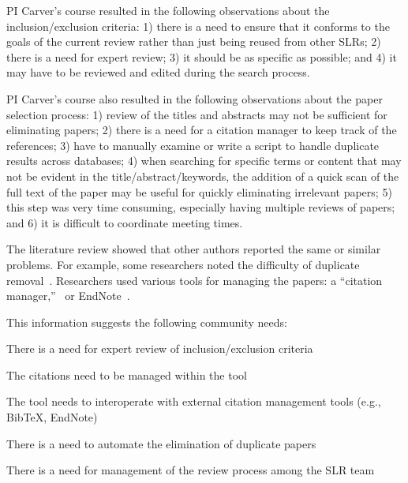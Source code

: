 PI Carver's course resulted in the following observations about the inclusion/exclusion criteria: 1) there is a need to ensure that it conforms to the goals of the current review rather than just being reused from other SLRs; 2) there is a need for expert review; 3) it should be as specific as possible; and 4) it may have to be reviewed and edited during the search process. 

PI Carver's course also resulted in the following observations about the paper selection process: 1) review of the titles and abstracts may not be sufficient for eliminating papers; 2) there is a need for a citation manager to keep track of the references; 3) have to manually examine or write a script to handle duplicate results across databases; 4) when searching for specific terms or content that may not be evident in the title/abstract/keywords, the addition of a quick scan of the full text of the paper may be useful for quickly eliminating irrelevant papers; 5) this step was very time consuming, especially having multiple reviews of papers; and 6) it is difficult to coordinate meeting times. 

The literature review showed that other authors reported the same or similar problems. For example, some researchers noted the difficulty of duplicate removal~\cite{DIKSjoeberg_et_al_2005}. Researchers used various tools for managing the papers: a ``citation manager,''~\cite{MuhammadSarmadAli_et_al_2010} or EndNote~\cite{SusanMMitchell_et_al_2009,LianpingChen_et_al_2011,HongyuPeiBreivold_et_al_2010}.

\vspace*{-4pt}
This information suggests the following community needs:
\begin{itemize*}
\begin{bfseries}
\item There is a need for expert review of inclusion/exclusion criteria
\item The citations need to be managed within the tool
\item The tool needs to interoperate with external citation management tools (e.g., BibTeX, EndNote)
\item There is a need to automate the elimination of duplicate papers
\item There is a need for management of the review process among the SLR team
\end{bfseries}
\end{itemize*}
\vspace*{-4pt}


